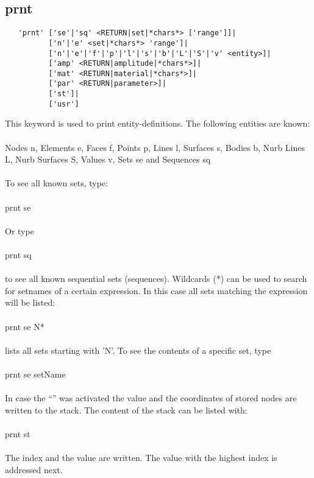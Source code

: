 \documentclass{article}
\begin{document}
\subsection{\label{prnt}prnt}
\begin{verbatim}
   'prnt' ['se'|'sq' <RETURN|set|*chars*> ['range']]|
          ['n'|'e' <set|*chars*> 'range']| 
          ['n'|'e'|'f'|'p'|'l'|'s'|'b'|'L'|'S'|'v' <entity>]| 
          ['amp' <RETURN|amplitude|*chars*>]|
          ['mat' <RETURN|material|*chars*>]|
          ['par' <RETURN|parameter>]|
          ['st']|
          ['usr']
\end{verbatim}
This keyword is used to print entity-definitions. The following entities are known:\\\\
Nodes n, Elements e, Faces f, Points p, Lines l, Surfaces s, Bodies b, Nurb
Lines L, Nurb Surfaces S, Values v, Sets se and Sequences sq\\\\To see all
known sets, type:\\\\prnt se\\\\Or type\\\\prnt sq\\\\to see all known
sequential sets (sequences). Wildcards (*) can be used to search for setnames
of a certain expression. In this case all sets matching the expression will be
listed:\\\\prnt se N*\\\\lists all sets starting with 'N'. To see the contents
of a specific set, type\\\\prnt se setName\\\\In case the
``'' was activated the value and the coordinates of
stored nodes are written to the stack. The content of the stack can be listed
with:\\\\prnt st\\\\The index and the value are written. The value with the
highest index is addressed next.
\end{document}

